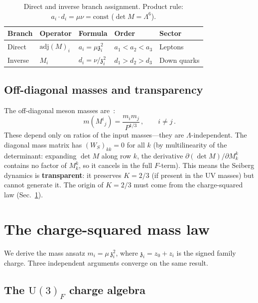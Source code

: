 \documentclass[aps,prd,twocolumn,showpacs,preprintnumbers,superscriptaddress,floatfix]{revtex4-2}
\newcommand{\UU}{\mathrm{U}}
\newcommand{\adj}{\mathrm{adj}}
\newcommand{\zch}{\mathfrak{z}}
\begin{document}
\begin{table}
\centering\small
\caption{Direct and inverse branch assignment.
  Product rule: $a_i \cdot d_i = \mu\nu = \text{const}$
  ($\det M = \Lambda^6$).}
\label{tab:branches}
\begin{tabular}{lllll}
\hline
Branch & Operator & Formula & Order & Sector \\
\hline
Direct & $\adj(M)_i$ & $a_i = \mu\zch_i^2$ & $a_1 < a_2 < a_3$ & Leptons \\
Inverse & $M_i$ & $d_i = \nu/\zch_i^2$ & $d_1 > d_2 > d_3$ & Down quarks \\
\hline
\end{tabular}
\end{table}


\subsection{Off-diagonal masses and transparency}

The off-diagonal meson masses
are~\cite{CsakiSchmaltzSkiba:1997}:
\begin{equation}
  m(M^i{}_j) = \frac{m_i m_j}{P^{1/3}}\,,
  \qquad i \neq j\,.
  \label{eq:offdiag}
\end{equation}
These depend only on ratios of the input masses---they are
$\Lambda$-independent.
The diagonal mass matrix has $(W_S)_{kk} = 0$ for all $k$
(by multilinearity of the determinant: expanding $\det M$ along
row $k$, the derivative $\partial(\det M)/\partial M_k^k$
contains no factor of $M_k^k$, so it cancels in the full
$F$-term).
This means the Seiberg dynamics is \textbf{transparent}: it
preserves $K = 2/3$ (if present in the UV masses) but cannot
generate it.
The origin of $K = 2/3$ must come from the charge-squared law
(Sec.~\ref{sec:charges}).


\section{The charge-squared mass law}
\label{sec:charges}

We derive the mass ansatz $m_i = \mu\,\zch_i^2$, where
$\zch_i = z_0 + z_i$ is the signed family charge.
Three independent arguments converge on the same result.

\subsection{The $\UU(3)_F$ charge algebra}
\label{sec:charge_algebra}
\end{document}
